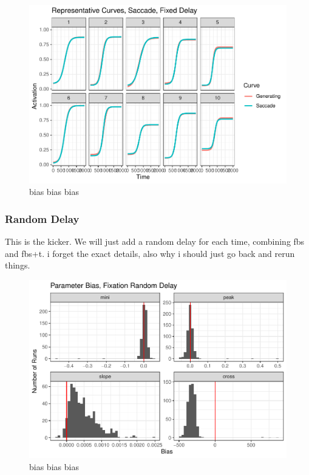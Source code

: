 \documentclass{article}
\begin{document}
\begin{figure}[h]
\centering
\includegraphics{saccade_fixed_pb_curves.pdf}
\caption{bias bias bias}
\label{fig:somethingwieliajslk}
\end{figure}



\subsubsection{Random Delay}

This is the kicker. We will just add a random delay for each time, combining fbs and fbs+t. i forget the exact details, also why i should just go back and rerun things.


\begin{figure}[h]
\centering
\includegraphics{fixation_random_par_bias.pdf}
\caption{bias bias bias}
\label{fig:fixation_random_par_bias}
\end{figure}
\end{document}
